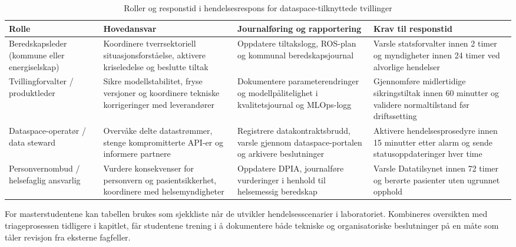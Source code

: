 \begin{table}[ht]
    \centering
    \caption{Roller og responstid i hendelsesrespons for dataspace-tilknyttede tvillinger}
    \label{tab:hendelsesroller}
    \begin{tabular}{|p{3.4cm}|p{4.4cm}|p{4.6cm}|p{3.0cm}|}
        \hline
        \textbf{Rolle} & \textbf{Hovedansvar} & \textbf{Journalføring og rapportering} & \textbf{Krav til responstid} \\
        \hline
        Beredskapsleder (kommune eller energiselskap) & Koordinere tverrsektoriell situasjonsforståelse, aktivere kriseledelse og beslutte tiltak & Oppdatere tiltakslogg, ROS-plan og kommunal beredskapsjournal \citep{dsb2022beredskap,dsb2023ovelser} & Varsle statsforvalter innen 2 timer og myndigheter innen 24 timer ved alvorlige hendelser \citep{dsb2024nser} \\
        \hline
        Tvillingforvalter / produktleder & Sikre modellstabilitet, fryse versjoner og koordinere tekniske korrigeringer med leverandører & Dokumentere parameterendringer og modellpålitelighet i kvalitetsjournal og MLOps-logg \citep{iso10007-2017,iso20000-1-2018} & Gjennomføre midlertidige sikringstiltak innen 60 minutter og validere normaltilstand før driftssetting \\
        \hline
        Dataspace-operatør / data steward & Overvåke delte datastrømmer, stenge kompromitterte API-er og informere partnere & Registrere datakontraktsbrudd, varsle gjennom dataspace-portalen og arkivere beslutninger \citep{dataspaces2023skills,nhn2024dataspace} & Aktivere hendelsesprosedyre innen 15 minutter etter alarm og sende statusoppdateringer hver time \\
        \hline
        Personvernombud / helsefaglig ansvarlig & Vurdere konsekvenser for personvern og pasientsikkerhet, koordinere med helsemyndigheter & Oppdatere DPIA, journalføre vurderinger i henhold til helsemessig beredskap \citep{helsedir2023beredskap,helseplattformen2023kontinuitet} & Varsle Datatilsynet innen 72 timer og berørte pasienter uten ugrunnet opphold \citep{eu2022nis2} \\
        \hline
    \end{tabular}
\end{table}

For masterstudentene kan tabellen brukes som sjekkliste når de utvikler hendelsesscenarier i laboratoriet. Kombineres oversikten med triageprosessen tidligere i kapitlet, får studentene trening i å dokumentere både tekniske og organisatoriske beslutninger på en måte som tåler revisjon fra eksterne fagfeller.


